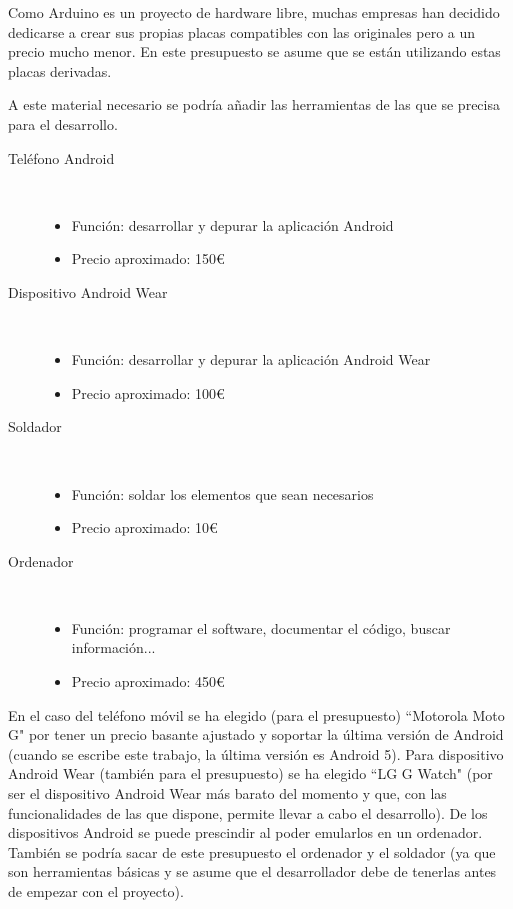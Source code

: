 Como Arduino es un proyecto de hardware libre, muchas empresas han decidido
dedicarse a crear sus propias placas compatibles con las originales pero a un
precio mucho menor. En este presupuesto se asume que se están utilizando estas
placas derivadas.

A este material necesario se podría añadir las herramientas de las que se precisa
para el desarrollo.

\begin{description}
  \item [Teléfono Android]\hfill \\
    \begin{itemize}
      \item {Función: desarrollar y depurar la aplicación Android}
      \item {Precio aproximado: 150\euro}
    \end{itemize}
  \item [Dispositivo Android Wear]\hfill \\
    \begin{itemize}
      \item {Función: desarrollar y depurar la aplicación Android Wear}
      \item {Precio aproximado: 100\euro}
    \end{itemize}
  \item [Soldador]\hfill \\
    \begin{itemize}
      \item {Función: soldar los elementos que sean necesarios}
      \item {Precio aproximado: 10\euro}
    \end{itemize}
    \item [Ordenador]\hfill \\
      \begin{itemize}
        \item {Función: programar el software, documentar el código, buscar información...}
        \item {Precio aproximado: 450\euro}
      \end{itemize}
\end{description}

En el caso del teléfono móvil se ha elegido (para el presupuesto) ``Motorola Moto G" por tener
un precio basante ajustado y soportar la última versión de Android (cuando se escribe este
trabajo, la última versión es Android 5). Para dispositivo Android Wear (también para el presupuesto)
se ha elegido ``LG G Watch" (por ser el dispositivo Android Wear más barato del momento
y que, con las funcionalidades de las que dispone, permite llevar a cabo el desarrollo). De los dispositivos
Android se puede prescindir al poder emularlos en un ordenador. También se podría sacar
de este presupuesto el ordenador y el soldador (ya que son herramientas básicas y se asume
que el desarrollador debe de tenerlas antes de empezar con el proyecto).

